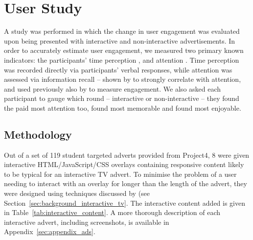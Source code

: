 \section{User Study}
	\label{sec:user_study}

	A study was performed in which the change in user engagement was evaluated upon being presented with interactive and non-interactive advertisements. In order to accurately estimate user engagement, we measured two primary known indicators: the participants' time perception \citep{time_perception}, and attention \cite{what_is_engagement}. Time perception was recorded directly via participants' verbal responses, while attention was assessed via information recall -- shown by \citet{interactions_attention_memory} to strongly correlate with attention, and used previously also by \citet{advertising_engagement} to measure engagement. We also asked each participant to gauge which round -- interactive or non-interactive -- they found the paid most attention too, found most memorable and found most enjoyable.

	\subsection{Methodology}
	Out of a set of 119 student targeted adverts provided from Project4, 8 were given interactive HTML/JavaScript/CSS overlays containing responsive content likely to be typical for an interactive TV advert. To minimise the problem of a user needing to interact with an overlay for longer than the length of the advert, they were designed using techniques discussed by \citet{integrated-approach-advertising} (see Section~\ref{sec:background_interactive_tv}. The interactive content added is given in Table~\ref{tab:interactive_content}. A more thorough description of each interactive advert, including screenshots, is available in Appendix~\ref{sec:appendix_ads}.

